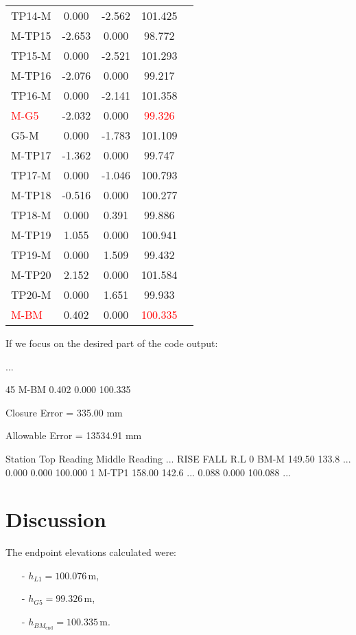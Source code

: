 \documentclass[12pt]{report}
\begin{document}
\begin{longtable}{lcccc}
TP14-M & 0.000 & -2.562 & 101.425 \\
M-TP15 & -2.653 & 0.000 & 98.772 \\
TP15-M & 0.000 & -2.521 & 101.293 \\
M-TP16 & -2.076 & 0.000 & 99.217 \\
TP16-M & 0.000 & -2.141 & 101.358 \\
\textcolor{red}{M-G5} & -2.032 & 0.000 & \textcolor{red}{99.326} \\
G5-M & 0.000 & -1.783 & 101.109 \\
M-TP17 & -1.362 & 0.000 & 99.747 \\
TP17-M & 0.000 & -1.046 & 100.793 \\
M-TP18 & -0.516 & 0.000 & 100.277 \\
TP18-M & 0.000 & 0.391 & 99.886 \\
M-TP19 & 1.055 & 0.000 & 100.941 \\
TP19-M & 0.000 & 1.509 & 99.432 \\
M-TP20 & 2.152 & 0.000 & 101.584 \\
TP20-M & 0.000 & 1.651 & 99.933 \\
\textcolor{red}{M-BM} & 0.402 & 0.000 & \textcolor{red}{100.335} \\
\bottomrule
\end{longtable}

If we focus on the desired part of the code output:

\begin{outputeofcode}
...

45    M-BM  0.402  0.000  100.335

Closure Error = 335.00 mm

Allowable Error = 13534.91 mm

   Station  Top Reading  Middle Reading  ...   RISE   FALL      R.L
0     BM-M       149.50           133.8  ...  0.000  0.000  100.000
1    M-TP1       158.00           142.6  ...  0.088  0.000  100.088
...
\end{outputeofcode}

\section*{Discussion}

The endpoint elevations calculated were:
\begin{itemize}
\item[-] \( h_{L1} = 100.076 \, \text{m} \),
\item[-] \( h_{G5} = 99.326 \, \text{m} \),
\item[-] \( h_{BM_{\text{end}}} = 100.335 \, \text{m} \).
\end{itemize}
\end{document}
